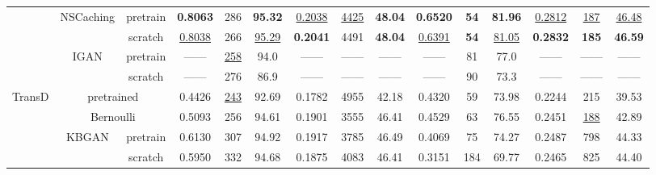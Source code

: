 \documentclass[conference]{IEEEtran}
\begin{document}
\begin{table*}[ht]
\begin{tabular}{c|c c|c c c|ccc|ccc|ccc}
	                          & NSCaching & pretrain &  \textbf{0.8063}   & 286             & \textbf{95.32}         & \underline{0.2038} & \underline{4425} &     \textbf{48.04}     & {\textbf{0.6520}}  &   \textbf{{54}}   &     \textbf{81.96}      & \underline{0.2812} & \underline{187} &   \underline{46.48}    \\
	                          &                 & scratch  & \underline{0.8038} & 266             & \underline{95.29}      &  \textbf{0.2041}   &       4491       &     \textbf{48.04}     & \underline{0.6391} &    \textbf{54}    &    \underline{81.05}    &  \textbf{0.2832}   &  \textbf{185}   &     \textbf{46.59}     \\
	                          &      IGAN       & pretrain &       ------       & \underline{258} & 94.0                   &       ------       &      ------      &         ------         &       ------       &        81         &          77.0           &       ------       &     ------      &         ------         \\
	                          &                 & scratch  &       ------       & 276             & 86.9                   &       ------       &      ------      &         ------         &       ------       &        90         &          73.3           &       ------       &     ------      &         ------         \\ \hline
	 \multirow{8}{*}{TransD}  &   \multicolumn{2}{c|}{pretrained}    &       0.4426       & \underline{243} & 92.69                  &       0.1782       &       4955       &         42.18          &       0.4320       &       {59}        &          73.98          &       0.2244       &       215       &         39.53          \\
	                          &    \multicolumn{2}{c|}{Bernoulli}    &       0.5093       & 256             & 94.61                  &       0.1901       &       3555       &         46.41          &       0.4529       &       {63}        &          76.55          &       0.2451       & \underline{188} &         42.89          \\
	                          &      KBGAN      & pretrain &       0.6130       & 307             & 94.92                  &       0.1917       &       3785       &         46.49          &       0.4069       &        75         &          74.27          &       0.2487       &       798       &         44.33          \\
	                          &                 & scratch  &       0.5950       & 332             & 94.68                  &       0.1875       &       4083       &         46.41          &       0.3151       &        184        &          69.77          &       0.2465       &       825       &         44.40          \\

\end{tabular}
\end{table*}
\end{document}
